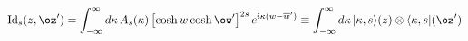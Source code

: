 \begin{equation}
\mathrm{Id}_s(z,\oz')=
\int_{-\infty}^{\infty}d\kappa\,A_s(\kappa)\,
\bigl[\cosh w\cosh\ow'\bigr]^{2s}
\,e^{i\kappa(w-\overline{w}')}
\equiv \int_{-\infty}^{\infty}d\kappa\,|\kappa,s\rangle(z)
\otimes\langle\kappa,s|(\oz')
\label{218}
\end{equation}

